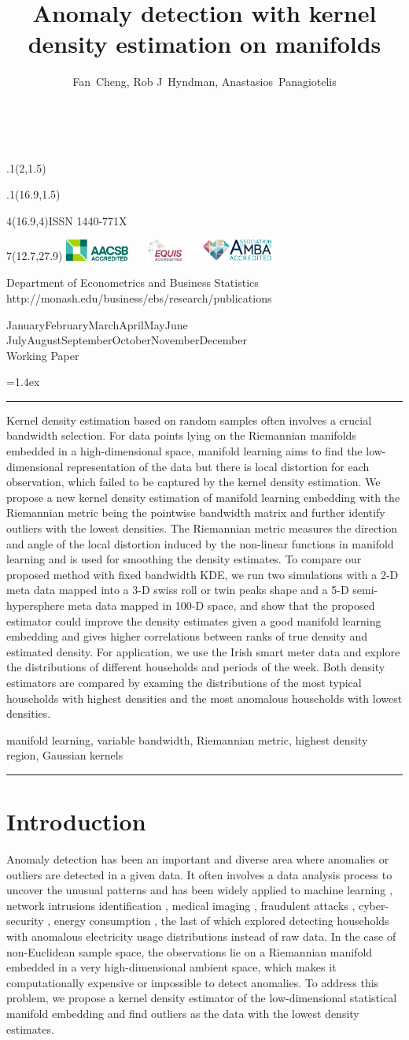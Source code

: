 \documentclass[11pt,a4paper,]{article}
\title{Anomaly detection with kernel density estimation on manifolds}
\author{Fan~Cheng, Rob J~Hyndman, Anastasios~Panagiotelis}
\date{\sf\Date~\Month~\Year}
\makeatletter
\def\Date{\number\day}
\def\Month{\ifcase\month\or
 January\or February\or March\or April\or May\or June\or
 July\or August\or September\or October\or November\or December\fi}
\def\Year{\number\year}
\def\showjel{{\large\textsf{\textbf{JEL classification:}}~\@jel}}
\def\cover{{\sffamily\setcounter{page}{0}
        \thispagestyle{empty}
        \placefig{2}{1.5}{width=5cm}{monash2}
        \placefig{16.9}{1.5}{width=2.1cm}{MBusSchool}
        \begin{textblock}{4}(16.9,4)ISSN 1440-771X\end{textblock}
        \begin{textblock}{7}(12.7,27.9)\hfill
        \includegraphics[height=0.7cm]{AACSB}~~~
        \includegraphics[height=0.7cm]{EQUIS}~~~
        \includegraphics[height=0.7cm]{AMBA}
        \end{textblock}
        \vspace*{2cm}
        \begin{center}\Large
        Department of Econometrics and Business Statistics\\[.5cm]
        \footnotesize http://monash.edu/business/ebs/research/publications
        \end{center}\vspace{2cm}
        \begin{center}
        \fbox{\parbox{14cm}{\begin{onehalfspace}\centering\Huge\vspace*{0.3cm}
                \textsf{\textbf{\expandafter{\@title}}}\vspace{1cm}\par
                \LARGE\@author\end{onehalfspace}
        }}
        \end{center}
        \vfill
                \begin{center}\Large
                \Month~\Year\\[1cm]
                Working Paper \@wp
        \end{center}\vspace*{2cm}}}
\def\pageone{{\sffamily\setstretch{1}%
        \thispagestyle{empty}%
        \vbox to \textheight{%
        \raggedright\baselineskip=1.2cm
     {\fontsize{24.88}{30}\sffamily\textbf{\expandafter{\@title}}}
        \vspace{2cm}\par
        \hspace{1cm}\parbox{14cm}{\sffamily\large\@addresses}\vspace{1cm}\vfill
        \hspace{1cm}{\large\Date~\Month~\Year}\\[1cm]
        \hspace{1cm}\showjel\vss}}}
\def\blindtitle{{\sffamily
     \thispagestyle{plain}\raggedright\baselineskip=1.2cm
     {\fontsize{24.88}{30}\sffamily\textbf{\expandafter{\@title}}}\vspace{1cm}\par
        }}
\def\titlepage{{\cover\newpage\pageone\newpage\blindtitle}}
\let\maketitle\titlepage
\newenvironment{keywords}{\par\vspace{0.5cm}\noindent{\sffamily\textbf{Keywords:}}}{\vspace{0.25cm}\par\hrule\vspace{0.5cm}\par}
\renewenvironment{abstract}{\begin{minipage}{\textwidth}\parskip=1.4ex\noindent
\hrule\vspace{0.1cm}\par{\sffamily\textbf{\abstractname}}\newline}
  {\end{minipage}}
\def\placefig#1#2#3#4{\begin{textblock}{.1}(#1,#2)\rlap{\texttt{[image: \#4]}}\end{textblock}}
\makeatother
\begin{document}
\maketitle
\begin{abstract}
Kernel density estimation based on random samples often involves a crucial bandwidth selection. For data points lying on the Riemannian manifolds embedded in a high-dimensional space, manifold learning aims to find the low-dimensional representation of the data but there is local distortion for each observation, which failed to be captured by the kernel density estimation. We propose a new kernel density estimation of manifold learning embedding with the Riemannian metric being the pointwise bandwidth matrix and further identify outliers with the lowest densities. The Riemannian metric measures the direction and angle of the local distortion induced by the non-linear functions in manifold learning and is used for smoothing the density estimates. To compare our proposed method with fixed bandwidth KDE, we run two simulations with a 2-D meta data mapped into a 3-D swiss roll or twin peaks shape and a 5-D semi-hypersphere meta data mapped in 100-D space, and show that the proposed estimator could improve the density estimates given a good manifold learning embedding and gives higher correlations between ranks of true density and estimated density. For application, we use the Irish smart meter data and explore the distributions of different households and periods of the week. Both density estimators are compared by examing the distributions of the most typical households with highest densities and the most anomalous households with lowest densities.
\end{abstract}
\begin{keywords}
manifold learning, variable bandwidth, Riemannian metric, highest density region, Gaussian kernels
\end{keywords}

\newpage

\hypertarget{introduction}{%
\section{Introduction}\label{introduction}}

Anomaly detection has been an important and diverse area where anomalies or outliers are detected in a given data. It often involves a data analysis process to uncover the unusual patterns and has been widely applied to machine learning \autocite{Omar2013-lz}, network intrusions identification \autocite{Ahmed2016-co,Bhuyan2013-ra}, medical imaging \autocite{Fernando2022-ef}, fraudulent attacks \autocite{Ahmed2016-dz}, cyber-security \autocite{Ten2011-co}, energy consumption \autocite{Cheng2021-ex}, the last of which explored detecting households with anomalous electricity usage distributions instead of raw data.
In the case of non-Euclidean sample space, the observations lie on a Riemannian manifold embedded in a very high-dimensional ambient space, which makes it computationally expensive or impossible to detect anomalies. To address this problem, we propose a kernel density estimator of the low-dimensional statistical manifold embedding and find outliers as the data with the lowest density estimates.
\end{document}
